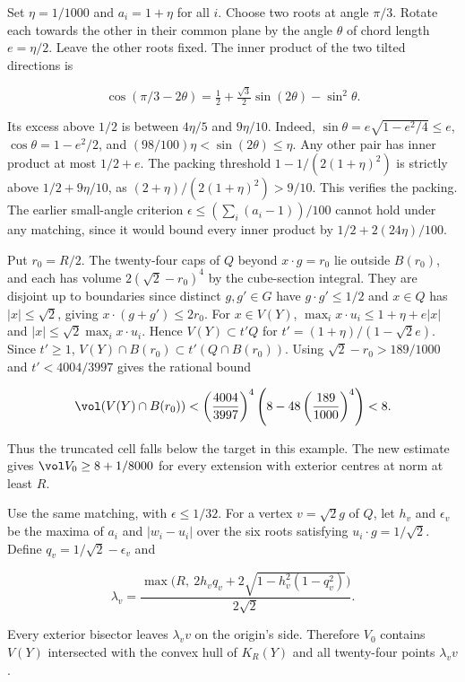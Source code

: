 \begin{example}\label{ex:exact-shell-tilt}
Set $\eta=1/1000$ and $a_i=1+\eta$ for all $i$. Choose two roots at angle $\pi/3$. Rotate
each towards the other in their common plane by the angle $\theta$ of chord length
$e=\eta/2$. Leave the other roots fixed. The inner product of the two tilted directions is

\[
\cos(\pi/3-2\theta)=\tfrac12+\tfrac{\sqrt3}{2}\sin(2\theta)-\sin^2\theta.
\]

Its excess above $1/2$ is between $4\eta/5$ and $9\eta/10$. Indeed,
$\sin\theta=e\sqrt{1-e^2/4}\le e$, $\cos\theta=1-e^2/2$, and
$(98/100)\eta<\sin(2\theta)\le\eta$. Any other pair has inner product at most $1/2+e$. The
packing threshold $1-1/(2(1+\eta)^2)$ is strictly above $1/2+9\eta/10$, as
$(2+\eta)/(2(1+\eta)^2)>9/10$. This verifies the packing. The earlier small-angle
criterion $\epsilon\le(\sum_i(a_i-1))/100$ cannot hold under any matching, since it would
bound every inner product by $1/2+2(24\eta)/100$.

Put $r_0=R/2$. The twenty-four caps of $Q$ beyond $x\cdot g=r_0$ lie outside $B(r_0)$, and
each has volume $2(\sqrt2-r_0)^4$ by the cube-section integral. They are disjoint up to
boundaries since distinct $g,g'\in G$ have $g\cdot g'\le1/2$ and $x\in Q$ has
$|x|\le\sqrt2$, giving $x\cdot(g+g')\le2r_0$. For $x\in V(Y)$, $\max_i x\cdot
u_i\le1+\eta+e|x|$ and $|x|\le\sqrt2\max_i x\cdot u_i$. Hence $V(Y)\subset t'Q$ for
$t'=(1+\eta)/(1-\sqrt2e)$. Since $t'\ge1$, $V(Y)\cap B(r_0)\subset t'(Q\cap B(r_0))$.
Using $\sqrt2-r_0>189/1000$ and $t'<4004/3997$ gives the rational bound

\[
\vol(V(Y)\cap B(r_0))
< \left(\frac{4004}{3997}\right)^4\left(8-48\left(\frac{189}{1000}\right)^4\right)
<8.
\]

Thus the truncated cell falls below the target in this example. The new estimate gives
$\vol V_0\ge8+1/8000$ for every extension with exterior centres at norm at least $R$.
\end{example}

\begin{prop}\label{prop:exact-shell-vertices}
Use the same matching, with $\epsilon\le1/32$. For a vertex $v=\sqrt2g$ of $Q$, let $h_v$
and $\epsilon_v$ be the maxima of $a_i$ and $|w_i-u_i|$ over the six roots satisfying
$u_i\cdot g=1/\sqrt2$. Define $q_v=1/\sqrt2-\epsilon_v$ and

\[
\lambda_v=\frac{\max\bigl(R,\ 2h_vq_v+2\sqrt{1-h_v^2(1-q_v^2)}\bigr)}{2\sqrt2}.
\]

Every exterior bisector leaves $\lambda_v v$ on the origin's side. Therefore $V_0$
contains $V(Y)$ intersected with the convex hull of $K_R(Y)$ and all twenty-four points
$\lambda_v v$.
\end{prop}

